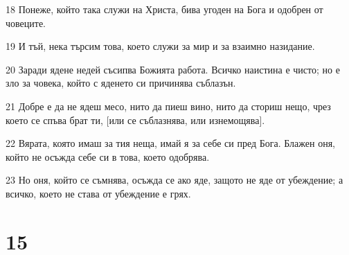 \par 18 Понеже, който така служи на Христа, бива угоден на Бога и одобрен от човеците.
\par 19 И тъй, нека търсим това, което служи за мир и за взаимно назидание.
\par 20 Заради ядене недей съсипва Божията работа. Всичко наистина е чисто; но е зло за човека, който с яденето си причинява съблазън.
\par 21 Добре е да не ядеш месо, нито да пиеш вино, нито да сториш нещо, чрез което се спъва брат ти, [или се съблазнява, или изнемощява].
\par 22 Вярата, която имаш за тия неща, имай я за себе си пред Бога. Блажен оня, който не осъжда себе си в това, което одобрява.
\par 23 Но оня, който се съмнява, осъжда се ако яде, защото не яде от убеждение; а всичко, което не става от убеждение е грях.

\chapter{15}

